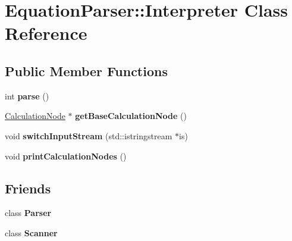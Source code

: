 \hypertarget{classEquationParser_1_1Interpreter}{}\section{Equation\+Parser\+:\+:Interpreter Class Reference}
\label{classEquationParser_1_1Interpreter}
\subsection*{Public Member Functions}
\begin{DoxyCompactItemize}
\item 
int {\bfseries parse} ()\hypertarget{classEquationParser_1_1Interpreter_aa88f207642eaa0a2d04cf5d050957c1a}{}\label{classEquationParser_1_1Interpreter_aa88f207642eaa0a2d04cf5d050957c1a}

\item 
\hyperlink{classCalculationNode}{Calculation\+Node} $\ast$ {\bfseries get\+Base\+Calculation\+Node} ()\hypertarget{classEquationParser_1_1Interpreter_ac861c17080e13412300574e96612d114}{}\label{classEquationParser_1_1Interpreter_ac861c17080e13412300574e96612d114}

\item 
void {\bfseries switch\+Input\+Stream} (std\+::istringstream $\ast$is)\hypertarget{classEquationParser_1_1Interpreter_a4dc3765926d0bf9d103859f713bd1e32}{}\label{classEquationParser_1_1Interpreter_a4dc3765926d0bf9d103859f713bd1e32}

\item 
void {\bfseries print\+Calculation\+Nodes} ()\hypertarget{classEquationParser_1_1Interpreter_a0281f87ae26693913d9b880efb3cc525}{}\label{classEquationParser_1_1Interpreter_a0281f87ae26693913d9b880efb3cc525}

\end{DoxyCompactItemize}
\subsection*{Friends}
\begin{DoxyCompactItemize}
\item 
class {\bfseries Parser}\hypertarget{classEquationParser_1_1Interpreter_ab80291af9c262f63b83fa9c16f12014d}{}\label{classEquationParser_1_1Interpreter_ab80291af9c262f63b83fa9c16f12014d}

\item 
class {\bfseries Scanner}\hypertarget{classEquationParser_1_1Interpreter_af4a8f36320cb35fb6b88d6b9a33cb524}{}\label{classEquationParser_1_1Interpreter_af4a8f36320cb35fb6b88d6b9a33cb524}

\end{DoxyCompactItemize}


